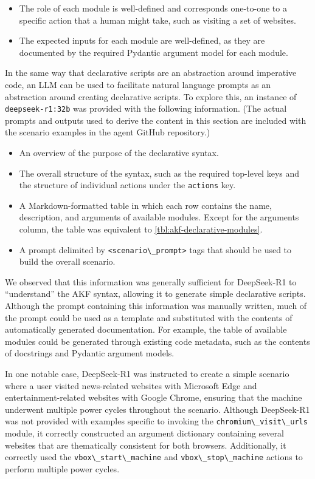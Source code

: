 \begin{itemize}
\item
  The role of each module is well-defined and corresponds one-to-one to
  a specific action that a human might take, such as visiting a set of
  websites.
\item
  The expected inputs for each module are well-defined, as they are
  documented by the required Pydantic argument model for each module.
\end{itemize}

In the same way that declarative scripts are an abstraction around
imperative code, an LLM can be used to facilitate natural language
prompts as an abstraction around creating declarative scripts. To
explore this, an instance of \passthrough{\lstinline!deepseek-r1:32b!}
was provided with the following information. (The actual prompts and
outputs used to derive the content in this section are included with the
scenario examples in the agent GitHub repository.)

\begin{itemize}
\item
  An overview of the purpose of the declarative syntax.
\item
  The overall structure of the syntax, such as the required top-level
  keys and the structure of individual actions under the
  \passthrough{\lstinline!actions!} key.
\item
  A Markdown-formatted table in which each row contains the name,
  description, and arguments of available modules. Except for the
  arguments column, the table was equivalent to
  \autoref{tbl:akf-declarative-modules}.
\item
  A prompt delimited by \passthrough{\lstinline!<scenario\_prompt>!}
  tags that should be used to build the overall scenario.
\end{itemize}

We observed that this information was generally sufficient for
DeepSeek-R1 to ``understand'' the AKF syntax, allowing it to generate
simple declarative scripts. Although the prompt containing this
information was manually written, much of the prompt could be used as a
template and substituted with the contents of automatically generated
documentation. For example, the table of available modules could be
generated through existing code metadata, such as the contents of
docstrings and Pydantic argument models.

In one notable case, DeepSeek-R1 was instructed to create a simple
scenario where a user visited news-related websites with Microsoft Edge
and entertainment-related websites with Google Chrome, ensuring that the
machine underwent multiple power cycles throughout the scenario.
Although DeepSeek-R1 was not provided with examples specific to invoking
the \passthrough{\lstinline!chromium\_visit\_urls!} module, it correctly
constructed an argument dictionary containing several websites that are
thematically consistent for both browsers. Additionally, it correctly
used the \passthrough{\lstinline!vbox\_start\_machine!} and
\passthrough{\lstinline!vbox\_stop\_machine!} actions to perform
multiple power cycles.

